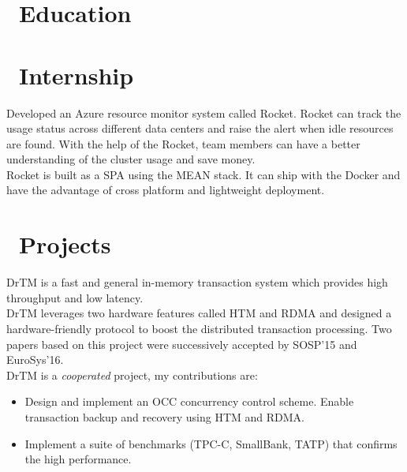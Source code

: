 \documentclass{resume}
\begin{document}



\section{\faGraduationCap\ Education}

\section{\faBriefcase\ Internship}
Developed an Azure resource monitor system called Rocket. Rocket can track the usage status across different data centers and raise the alert when idle resources are found. With the help of the Rocket, team members can have a better understanding of the cluster usage and save money.
\\[5pt]
Rocket is built as a SPA using the MEAN stack. It can ship with the Docker and have the advantage of cross platform and lightweight deployment.

\section{\faUsers\ Projects}
DrTM is a fast and general in-memory transaction system which provides high throughput and low latency.
\\[5pt]
DrTM leverages two hardware features called HTM and RDMA and designed a hardware-friendly protocol to boost the distributed transaction processing. Two papers based on this project were successively accepted by SOSP’15 and EuroSys’16.
\\[5pt]
DrTM is a \textit{cooperated} project, my contributions are:
\begin{itemize}
  \item {Design and implement an OCC concurrency control scheme. Enable transaction backup and recovery using HTM and RDMA.}
  \item {Implement a suite of benchmarks (TPC-C, SmallBank, TATP) that confirms the high performance.}
\end{itemize}
\end{document}
